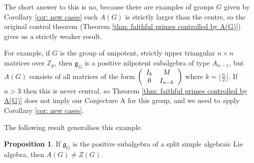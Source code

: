\documentclass[12pt,a4paper]{article}
\let\\=\cr
\theoremstyle{definition}
\newtheorem{propn}[thm]{Proposition}
\theoremstyle{remark}
\theoremstyle{custthm}
\begin{document}
The short answer to this is no, because there are examples of groups $G$ given by Corollary \ref{cor: new cases} such $A(G)$ is strictly larger than the centre, so the original control theorem (Theorem \ref{thm: faithful primes controlled by A(G)}) gives us a strictly weaker result. 

For example, if $G$ is the group of unipotent, strictly upper triangular $n\times n$ matrices over $\mathbb{Z}_p$, then $\mathfrak{g}_G$ is a positive nilpotent subalgebra of type $A_{n-1}$, but $A(G)$ consists of all matrices of the form $\left(\begin{array}{cc}
I_k & M \\
  0   & I_{n-k}
\end{array}\right)$ where $k=\lfloor\frac{n}{2}\rfloor$. If $n>3$ then this is never central, so Theorem \ref{thm: faithful primes controlled by A(G)} does not imply our Conjecture A for this group, and we need to apply Corollary \ref{cor: new cases}.

\noindent The following result generalises this example.

\begin{propn}
If $\mathfrak{g}_G$ is the positive subalgebra of a split simple algebraic Lie algebra, then $A(G)\neq Z(G)$.
\end{propn}
\end{document}

